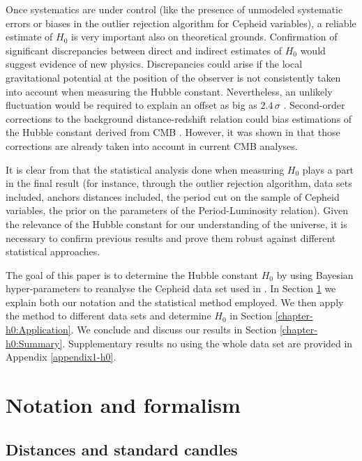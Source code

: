Once systematics are under control (like the presence of unmodeled systematic errors or biases in the outlier rejection algorithm for Cepheid variables), a reliable estimate of $H_0$ is very important also on theoretical grounds. Confirmation of significant discrepancies between direct and indirect estimates of $H_0$ would suggest evidence of new physics. Discrepancies could arise if the local gravitational potential at the position of the observer is not consistently taken into account when measuring the Hubble constant. Nevertheless, an unlikely fluctuation would be required to explain an offset as big as $2.4\,\sigma$ \cite{Marra2013a}. Second-order corrections to the background distance-redshift relation could bias estimations of the Hubble constant derived from CMB \cite{Clarkson:2014pda}. However, it was shown in \cite{Bonvin:2015uha} that those corrections are already taken into account in current CMB analyses.           

It is clear from \cite{Efstathiou:2013via} that the statistical analysis done when measuring $H_0$ plays a part in the final result (for instance, through the outlier rejection algorithm, data sets included, anchors distances included, the period cut on the sample of Cepheid variables, the prior on the parameters of the Period-Luminosity relation). Given the relevance of the Hubble constant for our understanding of the universe, it is necessary to confirm previous results and prove them robust against different statistical approaches.

The goal of this paper is to determine the Hubble constant $H_0$ by using Bayesian hyper-parameters to reanalyse the Cepheid data set used in \cite{Riess:2011yx}. In Section \ref{chapter-h0:notation-and-method} we explain both our notation and the statistical method employed. We then apply the method to different data sets and determine $H_0$ in Section \ref{chapter-h0:Application}. We conclude and discuss our results in Section \ref{chapter-h0:Summary}. Supplementary results no using the whole data set are provided in Appendix \ref{appendix1-h0}.

\section{Notation and formalism}
\label{chapter-h0:notation-and-method}

\subsection{Distances and standard candles}

